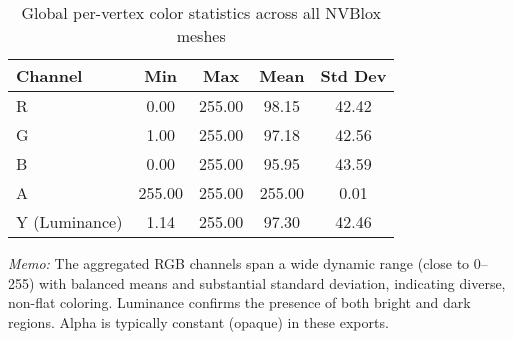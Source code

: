 \begin{table}[H]
\centering
\caption{Global per-vertex color statistics across all NVBlox meshes}
\begin{tabular}{lcccc}
\hline
\textbf{Channel} & \textbf{Min} & \textbf{Max} & \textbf{Mean} & \textbf{Std Dev} \\
\hline
R & 0.00 & 255.00 & 98.15 & 42.42 \\
G & 1.00 & 255.00 & 97.18 & 42.56 \\
B & 0.00 & 255.00 & 95.95 & 43.59 \\
A & 255.00 & 255.00 & 255.00 & 0.01 \\
Y (Luminance) & 1.14 & 255.00 & 97.30 & 42.46 \\
\hline
\end{tabular}
\label{tab:nvblox_color_stats_global}
\end{table}

\noindent\textit{Memo:} The aggregated RGB channels span a wide dynamic range (close to 0--255) with balanced means and substantial standard deviation, indicating diverse, non-flat coloring. Luminance confirms the presence of both bright and dark regions. Alpha is typically constant (opaque) in these exports.
